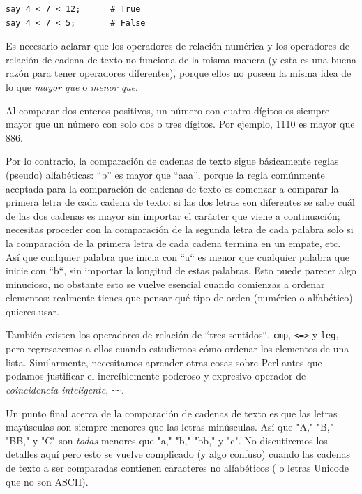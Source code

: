 \begin{lstlisting}
say 4 < 7 < 12;      # True
say 4 < 7 < 5;       # False
\end{lstlisting}

Es necesario aclarar que los operadores de relación
numérica y los operadores de relación de cadena de texto no 
funciona de la misma manera (y esta es una buena razón 
para tener operadores diferentes), porque ellos no poseen
la misma idea de lo que \emph{mayor que} o \emph{menor que}.

Al comparar dos enteros positivos, un número con cuatro dígitos
es siempre mayor que un número con solo dos o tres dígitos. 
Por ejemplo, 1110 es mayor que 886. 

Por lo contrario, la comparación de cadenas de texto
sigue básicamente reglas (pseudo) alfabéticas: 
``b'' es mayor que ``aaa'', porque la regla comúnmente
aceptada para la comparación de cadenas de texto es
comenzar a comparar la primera letra de cada cadena
de texto: si las dos letras son diferentes se sabe cuál de
las dos cadenas es mayor sin importar el carácter que viene
a continuación; necesitas proceder con la comparación
de la segunda letra de cada palabra solo si la comparación
de la primera letra de cada cadena termina en un empate, etc.
Así que cualquier palabra que inicia con ``a`` es menor que 
cualquier palabra que inicie con ``b``, sin importar la longitud
de estas palabras. Esto puede parecer algo minucioso, no 
obstante esto se vuelve esencial cuando comienzas 
a ordenar elementos: realmente tienes que pensar qué tipo
de orden (numérico o alfabético) quieres usar.

También existen los operadores de relación de ``tres sentidos``,
{\tt cmp}, {\tt <=>} y {\tt leg}, pero regresaremos a ellos
cuando estudiemos cómo ordenar los elementos de una lista. 
Similarmente, necesitamos aprender otras cosas sobre Perl antes
que podamos justificar el increíblemente poderoso y expresivo
operador de \emph{coincidencia inteligente}, \verb|~~|.
\ifplastex \else
{}
\fi

Un punto final acerca de la comparación de cadenas
de texto es que las letras mayúsculas son siempre menores
que las letras minúsculas. Así que  "A," "B," "BB," y "C"
son \emph{todas} menores que "a," "b," "bb," y "c".
No discutiremos los detalles aquí pero esto se vuelve
complicado (y algo confuso) cuando las cadenas de texto
a ser comparadas contienen caracteres no alfabéticos (
o letras Unicode que no son ASCII).

